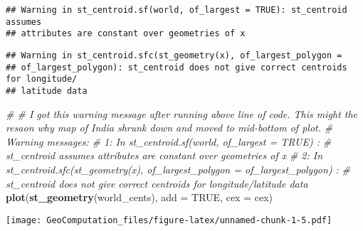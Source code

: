 \documentclass[]{article}
\newenvironment{Shaded}{\begin{snugshade}}{\end{snugshade}}
\newcommand{\CommentTok}[1]{\textcolor[rgb]{0.56,0.35,0.01}{\textit{#1}}}
\newcommand{\DataTypeTok}[1]{\textcolor[rgb]{0.13,0.29,0.53}{#1}}
\newcommand{\KeywordTok}[1]{\textcolor[rgb]{0.13,0.29,0.53}{\textbf{#1}}}
\newcommand{\NormalTok}[1]{#1}
\newcommand{\OtherTok}[1]{\textcolor[rgb]{0.56,0.35,0.01}{#1}}
\begin{document}
\begin{verbatim}
## Warning in st_centroid.sf(world, of_largest = TRUE): st_centroid assumes
## attributes are constant over geometries of x
\end{verbatim}

\begin{verbatim}
## Warning in st_centroid.sfc(st_geometry(x), of_largest_polygon =
## of_largest_polygon): st_centroid does not give correct centroids for longitude/
## latitude data
\end{verbatim}

\begin{Shaded}
\begin{Highlighting}[]
\CommentTok{# # I got this warning message after running above line of code. This might the resaon why map of India shrunk down and moved to mid-bottom of plot.}
\CommentTok{# Warning messages:}
\CommentTok{#   1: In st_centroid.sf(world, of_largest = TRUE) :}
\CommentTok{#   st_centroid assumes attributes are constant over geometries of x}
\CommentTok{# 2: In st_centroid.sfc(st_geometry(x), of_largest_polygon = of_largest_polygon) :}
\CommentTok{#   st_centroid does not give correct centroids for longitude/latitude data}
\KeywordTok{plot}\NormalTok{(}\KeywordTok{st_geometry}\NormalTok{(world_cents), }\DataTypeTok{add =} \OtherTok{TRUE}\NormalTok{, }\DataTypeTok{cex =}\NormalTok{ cex)}
\end{Highlighting}
\end{Shaded}

\texttt{[image: GeoComputation\_files/figure-latex/unnamed-chunk-1-5.pdf]}
\end{document}
